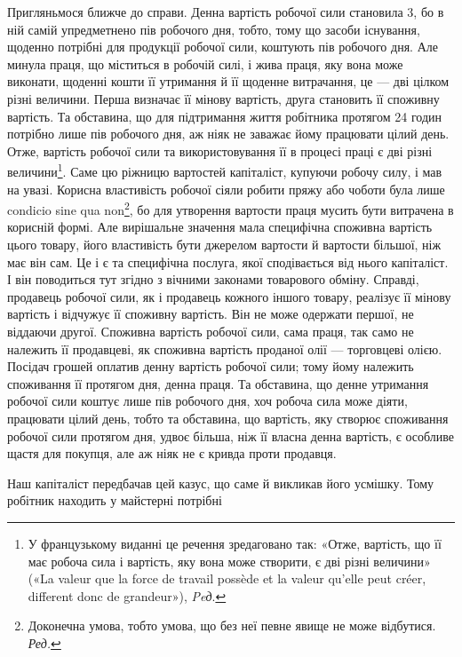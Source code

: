 Пригляньмося ближче до справи. Денна вартість робочої
сили становила 3, бо в ній самій упредметнено пів робочого
дня, тобто, тому що засоби існування, щоденно потрібні
для продукції робочої сили, коштують пів робочого дня. Але
минула праця, що міститься в робочій силі, і жива праця, яку
вона може виконати, щоденні кошти її утримання й її щоденне
витрачання, це — дві цілком різні величини. Перша визначає
її мінову вартість, друга становить її споживну вартість. Та
обставина, що для підтримання життя робітника протягом 24 годин
потрібно лише пів робочого дня, аж ніяк не заважає йому
працювати цілий день. Отже, вартість робочої сили та використовування
її в процесі праці є дві різні величини\footnote*{
У французькому виданні це речення зредаговано так: «Отже, вартість,
що її має робоча сила і вартість, яку вона може створити, є дві різні
величини» («La valeur que la force de travail possède et la valeur qu’elle
peut créer, different donc de grandeur»), \emph{Peд}.
}. Саме цю
ріжницю вартостей капіталіст, купуючи робочу силу, і мав на
увазі. Корисна властивість робочої сіяли робити пряжу або чоботи
була лише condicio sine qua non\footnote*{
Доконечна умова, тобто умова, що без неї певне явище не може відбутися.
\emph{Ред.}
}, бо для утворення вартости
праця мусить бути витрачена в корисній формі. Але вирішальне
значення мала специфічна споживна вартість цього товару, його
властивість бути джерелом вартости й вартости більшої, ніж має
він сам. Це і є та специфічна послуга, якої сподівається від нього
капіталіст. І він поводиться тут згідно з вічними законами товарового
обміну. Справді, продавець робочої сили, як і продавець
кожного іншого товару, реалізує її мінову вартість і відчужує її
споживну вартість. Він не може одержати першої, не віддаючи
другої. Споживна вартість робочої сили, сама праця, так само
не належить її продавцеві, як споживна вартість проданої олії —
торговцеві олією. Посідач грошей оплатив денну вартість робочої
сили; тому йому належить споживання її протягом дня, денна
праця. Та обставина, що денне утримання робочої сили коштує
лише пів робочого дня, хоч робоча сила може діяти, працювати
цілий день, тобто та обставина, що вартість, яку створює споживання
робочої сили протягом дня, удвоє більша, ніж її власна
денна вартість, є особливе щастя для покупця, але аж ніяк не
є кривда проти продавця.

Наш капіталіст передбачав цей казус, що саме й викликав
його усмішку. Тому робітник находить у майстерні потрібні
\parbreak{}  %
